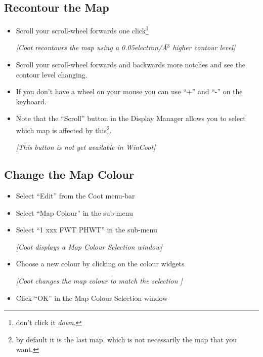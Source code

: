 \documentclass{article}
\begin{document}
\subsection{Recontour the Map}
\begin{itemize}
\item Scroll your scroll-wheel forwards one click\footnote{don't click
    it \emph{down}.}

 \textsl{ [Coot recontours the map using a 0.05electron/\AA$^3$ higher
  contour level]}

\item Scroll your scroll-wheel forwards and backwards more notches and
  see the contour level changing.
  
\item If you don't have a wheel on your mouse you can use ``+'' and
  ``-'' on the keyboard.
  
\item Note that the \textsf{``Scroll''} button in the Display Manager
  allows you to select which map is affected by this\footnote{by
    default it is the last map, which is not necessarily the map that
    you want.}.

 \emph{ [This button is not yet available in WinCoot]}


\end{itemize}


\subsection{Change the Map Colour}
\begin{itemize}
\item Select \textsf{``Edit''} from the Coot menu-bar
\item Select \textsf{``Map Colour''} in the sub-menu
\item Select \textsf{``1 xxx FWT PHWT''} in the sub-menu

\textsl{ [Coot displays a Map Colour Selection window]}

\item Choose a new colour by clicking on the colour widgets

\textsl{ [Coot changes the map colour to match the selection ]}

\item Click \textsf{``OK''} in the Map Colour Selection window

\end{itemize}
\end{document}
